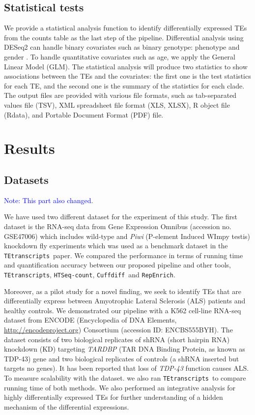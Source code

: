 \documentclass[wsdraft]{ws-procs11x85}
\newcommand{\TEtranscripts}{\texttt{TEtranscripts}}
\newcommand{\HTSeq}{\texttt{HTSeq-count}}
\newcommand{\Cuffdiff}{\texttt{Cuffdiff}}
\newcommand{\RepEnrich}{\texttt{RepEnrich}}
\begin{document}
\subsection{Statistical tests}
We provide a statistical analysis function to identify differentially expressed TEs from the counts table as the last step of the pipeline. 
Differential analysis using DESeq2 can handle  binary covariates such as binary genotype: phenotype and gender \cite{love2014moderated}. To handle quantitative covariates such as age, we apply the General Linear Model (GLM)\cite{johnston1980multivariate}. The statistical analysis will produce two statistics to show associations between the TEs and the covariates: the first one is the test statistics for each TE, and the second one is the summary of the statistics for each clade. 
The output files are provided with various file formats, such as tab-separated values file (TSV), XML spreadsheet file format (XLS, XLSX), R object file (Rdata), and Portable Document Format (PDF) file.

\section{Results}

\subsection{Datasets}

\textcolor{blue}{Note: This part also changed.}

We have used two different dataset for the experiment of this study. The first dataset is the RNA-seq data from Gene Expression Omnibus (accession no. GSE47006)
which includes wild-type and \textit{Piwi} (P-element Induced WImpy testis) knockdown fly experiments
which was used as a benchmark dataset in the \TEtranscripts~paper.\cite{ohtani2013dmgtsf1} We compared the performance in terms of running time and quantification accuracy between our proposed pipeline and other tools, \TEtranscripts, \HTSeq, \Cuffdiff~and \RepEnrich.\cite{jin2015tetranscripts,anders2015htseq,trapnell2013differential,criscione2014repenrich}

Moreover, as a pilot study for a novel finding, we seek to identify TEs that are  differentially express between Amyotrophic Lateral Sclerosis (ALS) patients and healthy  controls.
We demonstrated our pipeline with a K562 cell-line RNA-seq dataset from ENCODE (Encyclopedia of DNA Elements, \url{http://encodeproject.org})  Consortium (accession ID: ENCBS555BYH).\cite{encode2012integrated}
The dataset consists of two biological replicates of shRNA (short hairpin RNA) knockdown (KD) targeting \textit{TARDBP} (TAR DNA Binding Protein, as known as TDP-43) gene and two biological replicates of controls (a shRNA inserted but targets no genes). 
It has been reported that loss of \textit{TDP-43} function causes  ALS.\cite{yang2014partial,mihevc2016tdp} To measure scalability with the dataset. we also ran \TEtranscripts~to compare running time of both methods. We also performed an integrative analysis for highly differentially expressed TEs for further understanding of a hidden mechanism of the differential expressions.
\end{document}
